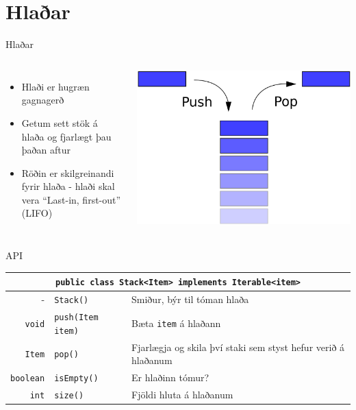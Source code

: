 \documentclass[handout]{beamer}
\begin{document}
\section{Hlaðar}

\begin{frame}{Hlaðar}
\begin{columns}[c]
\begin{itemize}
 \item Hlaði er hugræn gagnagerð
 \item Getum sett stök á hlaða og fjarlægt þau þaðan aftur
 \item Röðin er skilgreinandi fyrir hlaða - hlaði skal vera ``Last-in, first-out'' (LIFO)
\end{itemize}
\includegraphics[width=\linewidth]{Pics/stack}
\end{columns}
\end{frame}

\begin{frame}{API}
\begin{center}
\begin{tabularx}{\textwidth}{rlX}
\toprule
\multicolumn{3}{c}{\texttt{public class Stack<Item> implements Iterable<item>}}\\
\midrule
-&\texttt{Stack()}& Smiður, býr til tóman hlaða\\
\texttt{void}&\texttt{push(Item item)}&Bæta \texttt{item} á hlaðann\\
\texttt{Item}&\texttt{pop()}&Fjarlægja og skila því staki sem styst hefur verið á hlaðanum\\
\texttt{boolean}&\texttt{isEmpty()}&Er hlaðinn tómur?\\
\texttt{int}&\texttt{size()}&Fjöldi hluta á hlaðanum\\
\bottomrule
\end{tabularx}
\end{center}
\end{frame}
\end{document}
